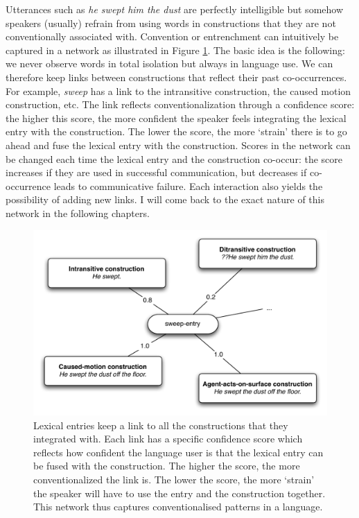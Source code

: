 Utterances such as {\em *he swept him the dust} are perfectly intelligible but somehow speakers (usually) refrain from using words in constructions that they are not conventionally associated with. Convention or entrenchment can intuitively be captured in a network as illustrated in Figure \ref{f:network-sweep}. The basic idea is the following: we never observe words in total isolation but always in language use. We can therefore keep links between constructions that reflect their past co-occurrences. For example, {\em sweep} has a link to the intransitive construction, the caused motion construction, etc. The link reflects conventionalization through a confidence score: the higher this score, the more confident the speaker feels integrating the lexical entry with the construction. The lower the score, the more `strain' there is to go ahead and fuse the lexical entry with the construction. Scores in the network can be changed each time the lexical entry and the construction co-occur: the score increases if they are used in successful communication, but decreases if co-occurrence leads to communicative failure. Each interaction also yields the possibility of adding new links. I will come back to the exact nature of this network in the following chapters.

\begin{figure}[tb]
\centerline{\includegraphics[width=\linewidth]{Chapter2/figs/network}}
 \caption[Network for {\em sweep}]{Lexical entries keep a link to all the constructions that they integrated with. Each link has a specific confidence score which reflects how confident the language user is that the lexical entry can be fused with the construction. The higher the score, the more conventionalized the link is. The lower the score, the more `strain' the speaker will have to use the entry and the construction together. This network thus captures conventionalised patterns in a language.}
   \label{f:network-sweep}
\end{figure}

